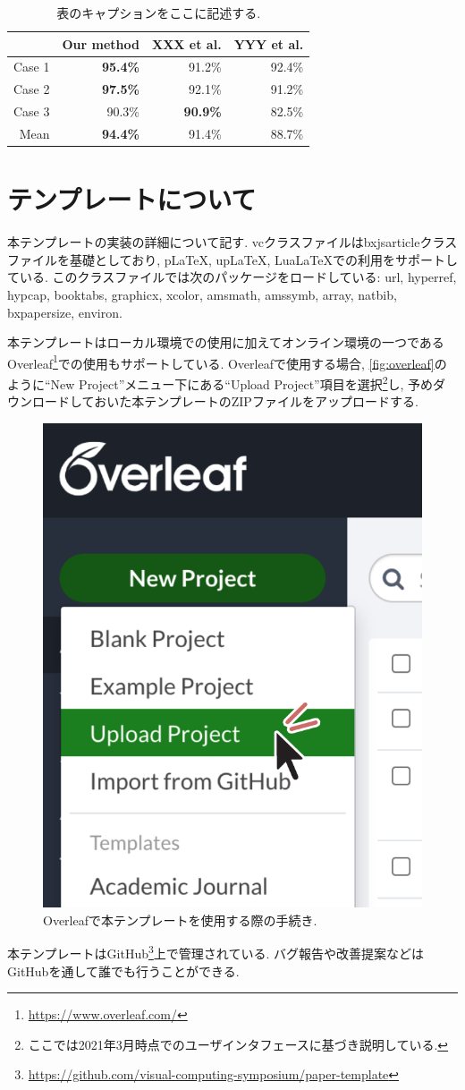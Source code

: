\documentclass{vc}
\begin{document}
\begin{table}
  \centering
  \caption{表のキャプションをここに記述する.}
  \label{tab:accuracy}
  \begin{tabular}{@{}rrrr@{}}
    \toprule
    & Our method & XXX et al. & YYY et al. \\
    \midrule
    Case 1 & \textbf{95.4\%} &         91.2\%  & 92.4\% \\
    Case 2 & \textbf{97.5\%} &         92.1\%  & 91.2\% \\
    Case 3 &         90.3\%  & \textbf{90.9\%} & 82.5\% \\
    \midrule
    Mean   & \textbf{94.4\%} &         91.4\%  & 88.7\% \\
    \bottomrule
  \end{tabular}
\end{table}

\section{テンプレートについて}

本テンプレートの実装の詳細について記す.
\textsf{vc}クラスファイルは\textsf{bxjsarticle}クラスファイルを基礎としており, pLaTeX, upLaTeX, LuaLaTeXでの利用をサポートしている.
このクラスファイルでは次のパッケージをロードしている:
\textsf{url},
\textsf{hyperref},
\textsf{hypcap},
\textsf{booktabs},
\textsf{graphicx},
\textsf{xcolor},
\textsf{amsmath},
\textsf{amssymb},
\textsf{array},
\textsf{natbib},
\textsf{bxpapersize},
\textsf{environ}.

本テンプレートはローカル環境での使用に加えてオンライン環境の一つであるOverleaf\footnote{\url{https://www.overleaf.com/}}での使用もサポートしている.
Overleafで使用する場合, \autoref{fig:overleaf}のように``New Project''メニュー下にある``Upload Project''項目を選択\footnote{ここでは2021年3月時点でのユーザインタフェースに基づき説明している.}し, 予めダウンロードしておいた本テンプレートのZIPファイルをアップロードする.

\begin{figure}
  \centering
  \includegraphics[width=.5\columnwidth]{./figures/overleaf.pdf}
  \caption{Overleafで本テンプレートを使用する際の手続き.}
  \label{fig:overleaf}
\end{figure}

本テンプレートはGitHub\footnote{\url{https://github.com/visual-computing-symposium/paper-template}}上で管理されている.
バグ報告や改善提案などはGitHubを通して誰でも行うことができる.



\end{document}
